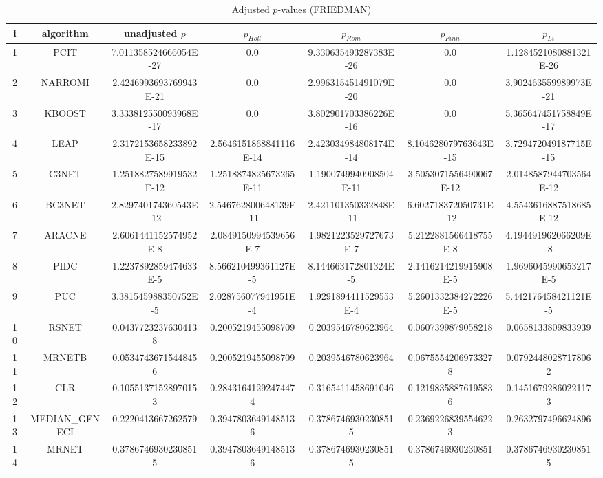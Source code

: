 \documentclass[a4paper,10pt]{article}
\begin{document}
\begin{landscape}
\begin{table}[!htp]
\centering\scriptsize
\caption{Adjusted $p$-values (FRIEDMAN)}
\begin{tabular}{ccccccc}
i&algorithm&unadjusted $p$&$p_{Holl}$&$p_{Rom}$&$p_{Finn}$&$p_{Li}$\\
\hline
1&PCIT&7.011358524666054E-27&0.0&9.330635493287383E-26&0.0&1.1284521080881321E-26\\
2&NARROMI&2.4246993693769943E-21&0.0&2.996315451491079E-20&0.0&3.902463559989973E-21\\
3&KBOOST&3.333812550093968E-17&0.0&3.802901703386226E-16&0.0&5.365647451758849E-17\\
4&LEAP&2.3172153658233892E-15&2.5646151868841116E-14&2.423034984808174E-14&8.104628079763643E-15&3.729472049187715E-15\\
5&C3NET&1.2518827589919532E-12&1.2518874825673265E-11&1.1900749940908504E-11&3.5053071556490067E-12&2.0148587944703564E-12\\
6&BC3NET&2.829740174360543E-12&2.546762800648139E-11&2.421101350332848E-11&6.602718372050731E-12&4.5543616887518685E-12\\
7&ARACNE&2.6061441152574952E-8&2.0849150994539656E-7&1.9821223529727673E-7&5.2122881566418755E-8&4.194491962066209E-8\\
8&PIDC&1.2237892859474633E-5&8.566210499361127E-5&8.144663172801324E-5&2.1416214219915908E-5&1.9696045990653217E-5\\
9&PUC&3.381545988350752E-5&2.028756077941951E-4&1.9291894411529553E-4&5.2601332384272226E-5&5.442176458421121E-5\\
10&RSNET&0.04377232376304138&0.2005219455098709&0.2039546780623964&0.0607399879058218&0.0658133809833939\\
11&MRNETB&0.05347436715448456&0.2005219455098709&0.2039546780623964&0.06755542069733278&0.07924480287178062\\
12&CLR&0.10551371528970153&0.28431641292474474&0.3165411458691046&0.12198358876195836&0.14516792860221173\\
13&MEDIAN_GENECI&0.2220413667262579&0.39478036491485136&0.37867469302308515&0.23692268395546223&0.2632797496624896\\
14&MRNET&0.37867469302308515&0.39478036491485136&0.37867469302308515&0.3786746930230851&0.37867469302308515\\
\hline
\end{tabular}
\end{table}


\newpage


\end{landscape}
\end{document}
